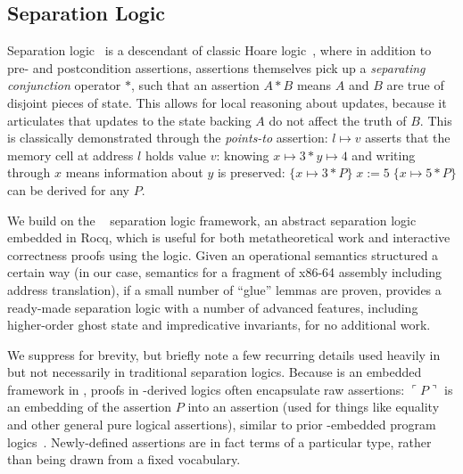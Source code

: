 \subsection{Separation Logic}
\label{sec:seplogic}
Separation logic~\cite{reynolds02} is a descendant of classic Hoare logic~\cite{hoare69},
where in addition to pre- and postcondition assertions, assertions themselves pick up a
\emph{separating conjunction} operator $\ast$, such that an assertion $A\ast B$ means $A$ and $B$ are true
of disjoint pieces of state. This allows for local reasoning about updates, because it articulates
that updates to the state backing $A$ do not affect the truth of $B$. This is classically demonstrated
through the \emph{points-to} assertion: $l\mapsto v$ asserts that the memory cell at address $l$ holds value $v$:
knowing $x\mapsto 3\ast y\mapsto 4$ and writing through $x$ means information about $y$ is preserved:
$\{x\mapsto 3\ast P\}\;x\mathrel{:=}5\;\{x\mapsto 5 \ast P\}$ can be derived for any $P$.

We build on the \iris~\cite{jung2018iris} separation logic framework,
an abstract separation logic embedded in Rocq, which is useful for both metatheoretical work
and interactive correctness proofs using the logic. Given an operational
semantics structured a certain way (in our case, semantics for
a fragment of x86-64 assembly including address translation),
if a small number of ``glue'' lemmas are proven, \iris
provides a ready-made separation logic with a number of advanced features, including
higher-order ghost state and impredicative invariants, for no additional work.

We suppress  for brevity, but briefly note
a few recurring details used heavily in \iris but not necessarily in traditional
separation logics.
Because \iris is an embedded framework in \rocq, proofs in \iris-derived
logics  often encapsulate raw \rocq assertions: $\ulcorner P \urcorner$ is an embedding
of the \rocq assertion $P$ into an \iris assertion (used for things like equality and other
general pure logical assertions), similar to prior \rocq-embedded program logics~\cite{Chlipala2013Bedrock}. Newly-defined \iris assertions are in fact
\rocq terms of a particular type, rather than being drawn from a fixed vocabulary.

